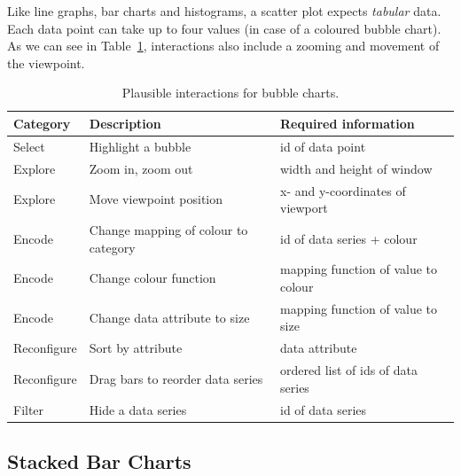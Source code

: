 Like line graphs, bar charts and histograms, a scatter plot expects \emph{tabular} data.
Each data point can take up to four values (in case of a coloured bubble chart).
As we can see in Table~\ref{tab:analysis:bubble-charts:interactions}, interactions also include a zooming and movement of the viewpoint.
\begin{table}[H]
  \caption{Plausible interactions for bubble charts.}%
  \label{tab:analysis:bubble-charts:interactions}
  \begin{tabularx}{\linewidth}{lXX}
    \bf Category & \bf Description & \bf Required information \\
    \hline
    Select & Highlight a bubble & id of data point \\
    Explore & Zoom in, zoom out & width and height of window \\
    Explore & Move viewpoint position & x- and y-coordinates of viewport \\
    Encode & Change mapping of colour to category & id of data series + colour \\
    Encode & Change colour function & mapping function of value to colour \\
    Encode & Change data attribute to size & mapping function of value to size \\
    Reconfigure & Sort by attribute & data attribute \\
    Reconfigure & Drag bars to reorder data series & ordered list of ids of data series \\
    Filter & Hide a data series & id of data series \\
  \end{tabularx}
\end{table}

\subsection{Stacked Bar Charts}

